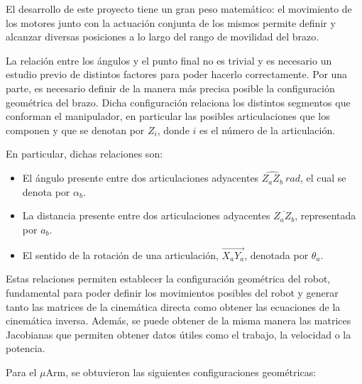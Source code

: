 El desarrollo de este proyecto tiene un gran peso matemático: el movimiento de los
motores junto con la actuación conjunta de los mismos permite definir y alcanzar
diversas posiciones a lo largo del rango de movilidad del brazo.

La relación entre los ángulos y el punto final no es trivial y es necesario un estudio
previo de distintos factores para poder hacerlo correctamente. Por una parte,
es necesario definir de la manera más precisa posible la configuración geométrica del
brazo. Dicha configuración relaciona los distintos segmentos que
conforman el manipulador, en particular las posibles articulaciones que
los componen y que se denotan por $Z_i$, donde $i$ es el número de la articulación.

En particular, dichas relaciones son:

\begin{itemize}
    \item El ángulo presente entre dos articulaciones adyacentes
          $\widehat{Z_aZ_b}~rad$, el cual se denota por $\alpha_b$.
    \item La distancia presente entre dos articulaciones adyacentes
          $\overline{Z_aZ_b}$, representada por $a_b$.
    \item El sentido de la rotación de una articulación,
          $\overrightarrow{X_aY_a}$, denotada por $\theta_a$.
\end{itemize}

Estas relaciones permiten establecer la configuración geométrica del robot,
fundamental para poder definir los movimientos posibles del robot y generar tanto
las matrices de la cinemática directa como obtener las ecuaciones de la cinemática
inversa. Además, se puede obtener de la misma manera las matrices Jacobianas que
permiten obtener datos útiles como el trabajo, la velocidad o la potencia.

Para el $\mu$Arm, se obtuvieron las siguientes configuraciones geométricas:

